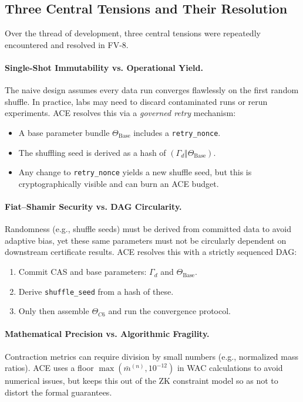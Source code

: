 \documentclass[11pt]{article}
\begin{document}
\subsection{Three Central Tensions and Their Resolution}

Over the thread of development, three central tensions were repeatedly encountered and resolved in FV-8.

\paragraph{Single-Shot Immutability vs. Operational Yield.}
The naive design assumes every data run converges flawlessly on the first random shuffle. In practice, labs may need to discard contaminated runs or rerun experiments. ACE resolves this via a \emph{governed retry} mechanism:

\begin{itemize}[nosep]
  \item A base parameter bundle $\Theta_{\text{Base}}$ includes a \texttt{retry\_nonce}.
  \item The shuffling seed is derived as a hash of $(\Gamma_d \Vert \Theta_{\text{Base}})$.
  \item Any change to \texttt{retry\_nonce} yields a new shuffle seed, but this is cryptographically visible and can burn an ACE budget.
\end{itemize}

\paragraph{Fiat--Shamir Security vs. DAG Circularity.}
Randomness (e.g., shuffle seeds) must be derived from committed data to avoid adaptive bias, yet these same parameters must not be circularly dependent on downstream certificate results. ACE resolves this with a strictly sequenced DAG:

\begin{enumerate}[nosep]
  \item Commit CAS and base parameters: $\Gamma_d$ and $\Theta_{\text{Base}}$.
  \item Derive \texttt{shuffle\_seed} from a hash of these.
  \item Only then assemble $\Theta_{C6}$ and run the convergence protocol.
\end{enumerate}

\paragraph{Mathematical Precision vs. Algorithmic Fragility.}
Contraction metrics can require division by small numbers (e.g., normalized mass ratios). ACE uses a floor $\max(\bar{m}^{(n)}, 10^{-12})$ in WAC calculations to avoid numerical issues, but keeps this out of the ZK constraint model so as not to distort the formal guarantees.
\end{document}

